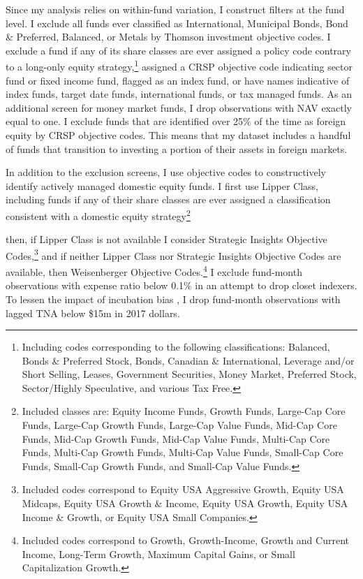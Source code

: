 \documentclass[]{book}
\let\rmarkdownfootnote\footnote%
\def\footnote{\protect\rmarkdownfootnote}
\theoremstyle{definition}
\theoremstyle{definition}
\theoremstyle{definition}
\theoremstyle{remark}
\begin{document}
Since my analysis relies on within-fund variation, I construct filters
at the fund level. I exclude all funds ever classified as International,
Municipal Bonds, Bond \& Preferred, Balanced, or Metals by Thomson
investment objective codes. I exclude a fund if any of its share classes
are ever assigned a policy code contrary to a long-only equity
strategy,\footnote{Including codes corresponding to the following
  classifications: Balanced, Bonds \& Preferred Stock, Bonds, Canadian
  \& International, Leverage and/or Short Selling, Leases, Government
  Securities, Money Market, Preferred Stock, Sector/Highly Speculative,
  and various Tax Free.} assigned a CRSP objective code indicating
sector fund or fixed income fund, flagged as an index fund, or have
names indicative of index funds, target date funds, international funds,
or tax managed funds. As an additional screen for money market funds, I
drop observations with NAV exactly equal to one. I exclude funds that
are identified over 25\% of the time as foreign equity by CRSP objective
codes. This means that my dataset includes a handful of funds that
transition to investing a portion of their assets in foreign markets.

In addition to the exclusion screens, I use objective codes to
constructively identify actively managed domestic equity funds. I first
use Lipper Class, including funds if any of their share classes are ever
assigned a classification consistent with a domestic equity
strategy\footnote{Included classes are: Equity Income Funds, Growth
  Funds, Large-Cap Core Funds, Large-Cap Growth Funds, Large-Cap Value
  Funds, Mid-Cap Core Funds, Mid-Cap Growth Funds, Mid-Cap Value Funds,
  Multi-Cap Core Funds, Multi-Cap Growth Funds, Multi-Cap Value Funds,
  Small-Cap Core Funds, Small-Cap Growth Funds, and Small-Cap Value
  Funds.}

then, if Lipper Class is not available I consider Strategic Insights
Objective Codes,\footnote{Included codes correspond to Equity USA
  Aggressive Growth, Equity USA Midcaps, Equity USA Growth \& Income,
  Equity USA Growth, Equity USA Income \& Growth, or Equity USA Small
  Companies.} and if neither Lipper Class nor Strategic Insights
Objective Codes are available, then Weisenberger Objective
Codes.\footnote{Included codes correspond to Growth, Growth-Income,
  Growth and Current Income, Long-Term Growth, Maximum Capital Gains, or
  Small Capitalization Growth.} I exclude fund-month observations with
expense ratio below 0.1\% in an attempt to drop closet indexers. To
lessen the impact of incubation bias \citep{evans10}, I drop fund-month
observations with lagged TNA below \$15m in 2017 dollars.
\end{document}
